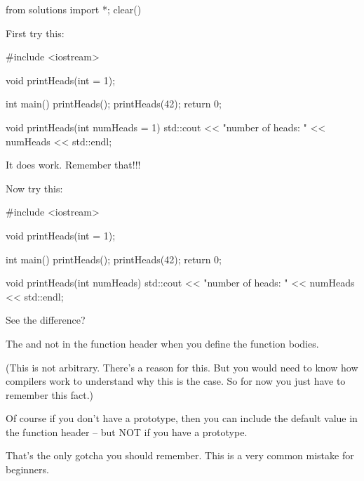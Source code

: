 \begin{python0}
from solutions import *; clear()
\end{python0}

First try this:

\begin{consolethree}[escapeinside=||]
#include <iostream>

void printHeads(int = 1);

int main()
{
    printHeads();
    printHeads(42);
    return 0;
}

void printHeads(int numHeads = 1)
{
    std::cout << "number of heads: " << numHeads
              << std::endl;
}
\end{consolethree}

It does  work. Remember that!!!

Now try this:

\begin{consolethree}[escapeinside=||]
#include <iostream>

void printHeads(int = 1);

int main()
{
    printHeads();
    printHeads(42);
    return 0;
}

void printHeads(int numHeads)
{
    std::cout << "number of heads: " << numHeads
              << std::endl;
}
\end{consolethree}

See the difference?

The  and not in the function header when you define the function bodies.

(This is not arbitrary. There's a reason for this. But you would need to know how compilers work to understand why this is the case. So for now you just have to remember this fact.)

Of course if you don't have a prototype, then you can include the default value in the function header -- but NOT if you have a prototype.

That's the only gotcha you should remember. This is a very common mistake for beginners.


